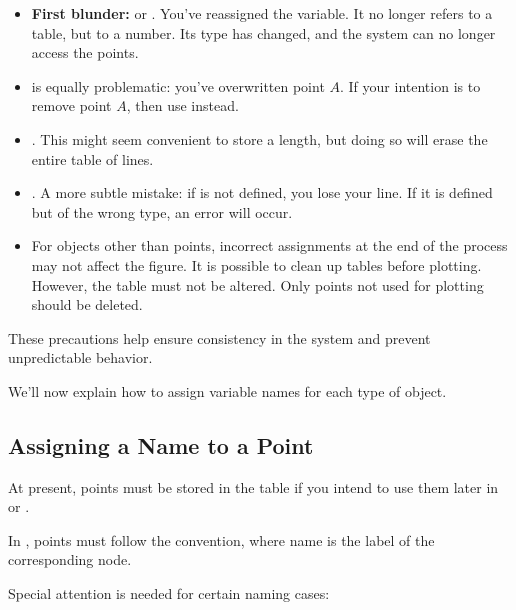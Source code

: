 \begin{itemize}
  \item \textbf{First blunder:}  or . You've reassigned the  variable. It no longer refers to a table, but to a number. Its type has changed, and the system can no longer access the points.
  \item {} is equally problematic: you’ve overwritten point $A$. If your intention is to remove point $A$, then use  instead.
  \item {}. This might seem convenient to store a length, but doing so will erase the entire table of lines.
  \item {}. A more subtle mistake: if  is not defined, you lose your line. If it is defined but of the wrong type, an error will occur.
  \item For objects other than points, incorrect assignments at the end of the process may not affect the figure. It is possible to clean up tables before plotting. However, the  table must not be altered. Only points not used for plotting should be deleted.
\end{itemize}

These precautions help ensure consistency in the system and prevent unpredictable behavior.

\vspace{1em}
We’ll now explain how to assign variable names for each type of object.

\subsection{Assigning a Name to a Point}
At present, points must be stored in the table  if you intend to use them later in \tkzNamePack{\TIKZ} or .

In , points must follow the  convention, where name is the label of the corresponding node.

Special attention is needed for certain naming cases:



